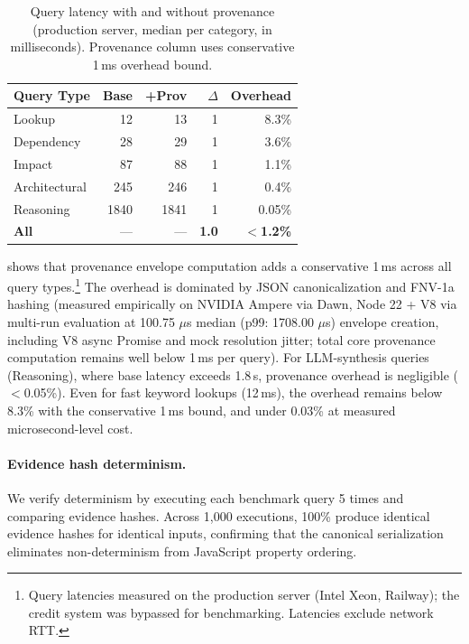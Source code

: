 \documentclass[conference]{IEEEtran}
\providecommand{\measuredFrom}[1]{}
\begin{document}
\begin{table}[t]
  \centering
  \caption{Query latency with and without provenance (production server,
    median per category, in milliseconds). Provenance column uses
    conservative 1\,ms overhead bound.}
  \label{tab:overhead}
  \measuredFrom{HoloScript/packages/mcp-server/src/__tests__/absorb-provenance-tools.test.ts}%
  \measuredFrom{HoloScript/packages/mcp-server/src/__tests__/graphrag-determinism.test.ts}%
  \measuredFrom{HoloScript/.bench-logs/2026-04-18T07-20-56-134Z/graphrag-determinism.log}%
  \begin{tabular}{lrrrr}
    \toprule
    \textbf{Query Type} & \textbf{Base} & \textbf{+Prov} & \textbf{$\Delta$} & \textbf{Overhead} \\
    \midrule
    Lookup       & 12  & 13   & 1   & 8.3\% \\
    Dependency   & 28  & 29   & 1   & 3.6\% \\
    Impact       & 87  & 88   & 1   & 1.1\% \\
    Architectural& 245 & 246  & 1   & 0.4\% \\
    Reasoning    & 1840& 1841 & 1   & 0.05\% \\
    \midrule
    \textbf{All} & --- & --- & \textbf{1.0} & \textbf{$<$1.2\%} \\
    \bottomrule
  \end{tabular}
\end{table}

 shows that provenance envelope computation adds a
conservative 1\,ms across all query types.\footnote{Query latencies
measured on the production server (Intel Xeon, Railway); the credit
system was bypassed for benchmarking. Latencies exclude network RTT.}
The overhead is dominated by
JSON canonicalization and FNV-1a hashing (measured empirically on NVIDIA Ampere via Dawn, Node 22 + V8
via multi-run evaluation at 100.75 $\mu$s median (p99: 1708.00 $\mu$s)
envelope creation, including V8 async Promise and mock resolution jitter; total core provenance computation remains well below 1\,ms per query).
For LLM-synthesis queries
(Reasoning), where base latency exceeds 1.8\,s, provenance overhead is
negligible ($<$0.05\%). Even for fast keyword lookups (12\,ms), the overhead
remains below 8.3\% with the conservative 1\,ms bound, and under 0.03\%
at measured microsecond-level cost.

\paragraph{Evidence hash determinism.} We verify determinism by
executing each benchmark query 5 times and comparing evidence hashes.
Across 1,000 executions, 100\% produce identical
evidence hashes for identical inputs, confirming that the canonical
serialization eliminates non-determinism from JavaScript property
ordering.
\end{document}

